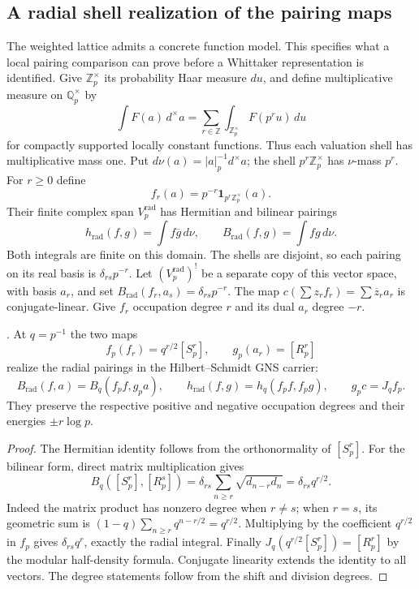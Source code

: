 \subsection{A radial shell realization of the pairing maps}
\label{v4-arith:kp:radial-shell-model}

The weighted lattice admits a concrete function model. This
specifies what a local pairing comparison can prove before a
Whittaker representation is identified. Give $\mathbb Z_p^\times$
its probability Haar measure $du$, and define multiplicative
measure on $\mathbb Q_p^\times$ by
\[
 \int F(a)\,d^\times a
   =\sum_{r\in\mathbb Z}\int_{\mathbb Z_p^\times}F(p^ru)\,du
\]
for compactly supported locally constant functions. Thus each
valuation shell has multiplicative mass one. Put
$d\nu(a)=|a|_p^{-1}d^\times a$; the shell
$p^r\mathbb Z_p^\times$ has $\nu$-mass $p^r$.
For $r\geq0$ define
\[
 f_r(a)=p^{-r}\mathbf1_{p^r\mathbb Z_p^\times}(a).
\]
Their finite complex span $V_p^{\mathrm{rad}}$ has Hermitian
and bilinear pairings
\[
 h_{\mathrm{rad}}(f,g)=\int f\overline g\,d\nu,
 \qquad B_{\mathrm{rad}}(f,g)=\int fg\,d\nu.
\]
Both integrals are finite on this domain. The shells are disjoint,
so each pairing on its real basis is
$\delta_{rs}p^{-r}$. Let $(V_p^{\mathrm{rad}})^!$ be a separate
copy of this vector space, with basis $a_r$, and set
$B_{\mathrm{rad}}(f_r,a_s)=\delta_{rs}p^{-r}$.
The map $c(\sum z_rf_r)=\sum\overline z_ra_r$ is conjugate-linear.
Give $f_r$ occupation degree $r$ and its dual $a_r$ degree $-r$.

\begin{theorem}
\label{v4-arith:kp:radial-pairing-realization}
\ClaimStatusProvedHere. At $q=p^{-1}$ the two maps
\[
 f_p(f_r)=q^{r/2}[S_p^r],\qquad
 g_p(a_r)=[R_p^r]
\]
realize the radial pairings in the Hilbert--Schmidt GNS carrier:
\[
 B_{\mathrm{rad}}(f,a)=B_q(f_pf,g_pa),\qquad
 h_{\mathrm{rad}}(f,g)=h_q(f_pf,f_pg),\qquad
 g_pc=J_qf_p.
\]
They preserve the respective positive and negative occupation
degrees and their energies $\pm r\log p$.
\end{theorem}

\begin{proof}
The Hermitian identity follows from the orthonormality of
$[S_p^r]$. For the bilinear form, direct matrix multiplication gives
\[
 B_q([S_p^r],[R_p^s])
   =\delta_{rs}\sum_{n\geq r}\sqrt{d_{n-r}d_n}
   =\delta_{rs}q^{r/2}.
\]
Indeed the matrix product has nonzero degree when $r\ne s$;
when $r=s$, its geometric sum is
$(1-q)\sum_{n\geq r}q^{n-r/2}=q^{r/2}$.
Multiplying by the coefficient $q^{r/2}$ in $f_p$ gives
$\delta_{rs}q^r$, exactly the radial integral. Finally
$J_q(q^{r/2}[S_p^r])=[R_p^r]$ by the modular half-density
formula. Conjugate linearity extends the identity to all vectors.
The degree statements follow from the shift and division degrees.
\end{proof}

